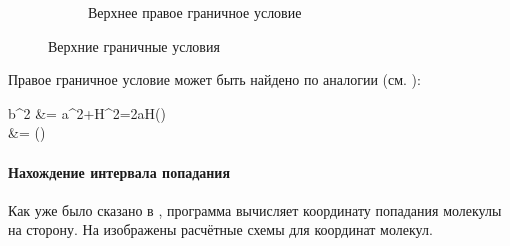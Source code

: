 \documentclass[../AISTR.tex]{subfiles}
\begin{document}
\begin{figure}[p]
\begin{subfigure}{0.5\linewidth}
		\caption{Верхнее правое граничное условие}
		\label{fig:verh_right}
	\end{subfigure}
	\caption{Верхние граничные условия}
	\label{fig:verh}
\end{figure}
Правое граничное условие может быть найдено по аналогии (см. ):
\begin{aleq}
	b^2 &= a^2+H^2=2aH\cos\left(\ru\right)\\
	\ru &= \arccos \left(\right)		
\end{aleq}
\paragraph{Нахождение интервала попадания}
Как уже было сказано в , программа вычисляет координату попадания молекулы на сторону. На  изображены расчётные схемы для координат молекул. 
\end{document}
